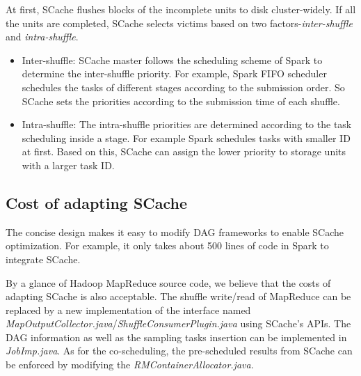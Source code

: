 At first, SCache flushes blocks of the incomplete units to disk cluster-widely.
If all the units are completed, SCache selects victims based on two factors-\textit{inter-shuffle} and \textit{intra-shuffle}.
\begin{itemize}[noitemsep]
	\item Inter-shuffle: SCache master follows the scheduling scheme of Spark to determine the inter-shuffle priority. 
	For example, Spark FIFO scheduler schedules the tasks of different stages according to the submission order. 
	So SCache sets the priorities according to the submission time of each shuffle.
	\item Intra-shuffle: The intra-shuffle priorities are determined according to the task scheduling inside a stage.
	For example Spark schedules tasks with smaller ID at first. 
	Based on this, SCache can assign the lower priority to storage units with a larger task ID.
\end{itemize}

\subsection{Cost of adapting SCache}
The concise design makes it easy to modify DAG frameworks to enable SCache optimization. 
For example, it only takes about 500 lines of code in Spark to integrate SCache. 

\ifrevision
{}
\fi

By a glance of Hadoop MapReduce \cite{hadoop} source code, we believe that the costs of adapting SCache is also acceptable. 
The shuffle write/read of MapReduce can be replaced by a new implementation of the interface named \textit{MapOutputCollector.java}/\textit{ShuffleConsumerPlugin.java} using SCache's APIs.
The DAG information as well as the sampling tasks insertion can be implemented in \textit{JobImp.java}.  
As for the co-scheduling, the pre-scheduled results from SCache can be enforced by modifying the \textit{RMContainerAllocator.java}. 

